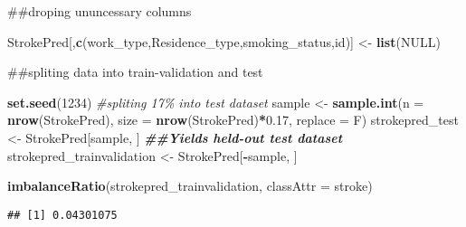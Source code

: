 \documentclass[
]{article}
\newenvironment{Shaded}{\begin{snugshade}}{\end{snugshade}}
\newcommand{\AttributeTok}[1]{\textcolor[rgb]{0.13,0.29,0.53}{#1}}
\newcommand{\CommentTok}[1]{\textcolor[rgb]{0.56,0.35,0.01}{\textit{#1}}}
\newcommand{\ConstantTok}[1]{\textcolor[rgb]{0.56,0.35,0.01}{#1}}
\newcommand{\DecValTok}[1]{\textcolor[rgb]{0.00,0.00,0.81}{#1}}
\newcommand{\DocumentationTok}[1]{\textcolor[rgb]{0.56,0.35,0.01}{\textbf{\textit{#1}}}}
\newcommand{\FloatTok}[1]{\textcolor[rgb]{0.00,0.00,0.81}{#1}}
\newcommand{\FunctionTok}[1]{\textcolor[rgb]{0.13,0.29,0.53}{\textbf{#1}}}
\newcommand{\NormalTok}[1]{#1}
\newcommand{\OtherTok}[1]{\textcolor[rgb]{0.56,0.35,0.01}{#1}}
\newcommand{\SpecialCharTok}[1]{\textcolor[rgb]{0.81,0.36,0.00}{\textbf{#1}}}
\newcommand{\StringTok}[1]{\textcolor[rgb]{0.31,0.60,0.02}{#1}}
\begin{document}
\#\#droping ununcessary columns

\begin{Shaded}
\begin{Highlighting}[]
\NormalTok{StrokePred[,}\FunctionTok{c}\NormalTok{(}\StringTok{\textquotesingle{}work\_type\textquotesingle{}}\NormalTok{,}\StringTok{\textquotesingle{}Residence\_type\textquotesingle{}}\NormalTok{,}\StringTok{\textquotesingle{}smoking\_status\textquotesingle{}}\NormalTok{,}\StringTok{\textquotesingle{}id\textquotesingle{}}\NormalTok{)] }\OtherTok{\textless{}{-}} \FunctionTok{list}\NormalTok{(}\ConstantTok{NULL}\NormalTok{)}
\end{Highlighting}
\end{Shaded}

\#\#spliting data into train-validation and test

\begin{Shaded}
\begin{Highlighting}[]
\FunctionTok{set.seed}\NormalTok{(}\DecValTok{1234}\NormalTok{)}
\CommentTok{\#spliting 17\% into test dataset}
\NormalTok{sample }\OtherTok{\textless{}{-}} \FunctionTok{sample.int}\NormalTok{(}\AttributeTok{n =} \FunctionTok{nrow}\NormalTok{(StrokePred), }\AttributeTok{size =} \FunctionTok{nrow}\NormalTok{(StrokePred)}\SpecialCharTok{*}\FloatTok{0.17}\NormalTok{, }\AttributeTok{replace =}\NormalTok{ F)}
\NormalTok{strokepred\_test }\OtherTok{\textless{}{-}}\NormalTok{ StrokePred[sample, ] }\DocumentationTok{\#\#Yields held{-}out test dataset}
\NormalTok{strokepred\_trainvalidation }\OtherTok{\textless{}{-}}\NormalTok{ StrokePred[}\SpecialCharTok{{-}}\NormalTok{sample, ]}
\end{Highlighting}
\end{Shaded}

\begin{Shaded}
\begin{Highlighting}[]
\FunctionTok{imbalanceRatio}\NormalTok{(strokepred\_trainvalidation, }\AttributeTok{classAttr =} \StringTok{\textquotesingle{}stroke\textquotesingle{}}\NormalTok{)}
\end{Highlighting}
\end{Shaded}

\begin{verbatim}
## [1] 0.04301075
\end{verbatim}

\begin{Shaded}
\end{Shaded}
\end{document}

